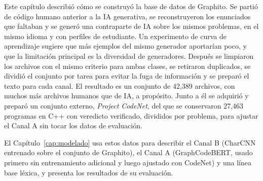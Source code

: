 Este capítulo describió cómo se construyó la base de datos de Graphito. Se partió de código humano anterior a la IA generativa, se reconstruyeron los enunciados que faltaban y se generó una contraparte de IA sobre los mismos problemas, en el mismo idioma y con perfiles de estudiante. Un experimento de curva de aprendizaje sugiere que más ejemplos del mismo generador aportarían poco, y que la limitación principal es la diversidad de generadores. Después se limpiaron los archivos con el mismo criterio para ambas clases, se retiraron duplicados, se dividió el conjunto por tarea para evitar la fuga de información y se preparó el texto para cada canal. El resultado es un conjunto de 42,389 archivos, con muchos más archivos humanos que de IA, a propósito. Junto a él se adquirió y preparó un conjunto externo, \textit{Project CodeNet}, del que se conservaron 27,463 programas en C++ con veredicto verificado, divididos por problema, para ajustar el Canal A sin tocar los datos de evaluación.

El Capítulo~\ref{cap:modelado} usa estos datos para describir el Canal B (CharCNN entrenado sobre el conjunto de Graphito), el Canal A (GraphCodeBERT, usado primero sin entrenamiento adicional y luego ajustado con CodeNet) y una línea base léxica, y presenta los resultados de su evaluación.
